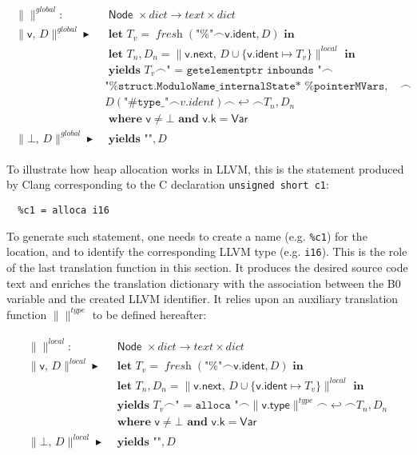 \documentclass{article}
\newcommand{\trad}[2]{\ensuremath{\lVert \textsf{#1} \rVert^{\textit{#2}}}}
\newcommand{\nl}[0]{\ensuremath{\hookleftarrow}}
\newcommand{\mty}[0]{\texttt{""}}
\DeclareMathOperator{\conc}{\smallfrown}
\DeclareMathOperator{\isdef}{\blacktriangleright}
\DeclareMathOperator{\fresh}{\textit{fresh}}
\begin{document}
\begin{framed}
\begin{align}
\begin{split}
  \trad{}{global} : & \textsf{ Node } \times dict \rightarrow text \times dict \\
  \trad{v, $D$}{global} \isdef & 
  \textbf{ let } T_v = \fresh(\texttt{"\%"}\conc\textsf{v.ident}, D) \textbf{ in}  \\
  & \textbf{ let } T_n, D_n = \trad{v.next, $D \cup \{ \textsf{v.ident} \mapsto T_v \}$}{local} \textbf{ in}  \\
  & \textbf{ yields } T_v \conc \texttt{" = getelementptr inbounds "} \conc\\
  & \texttt{"\%struct.ModuloName\_internalState* \%pointerMVars, i64 0, i32 "} \conc \\
  & D(\texttt{"\#type\_"}\conc v.ident) \conc \nl \conc T_n, D_n  \\
  & \textbf{ where } \textsf{v} \ne \bot \textbf{ and } \textsf{v.k} = \textsf{Var}  \\
  \trad{$\bot$, $D$}{global} \isdef & 
  \textbf{ yields } \mty, D 
\end{split}
\end{align}
\end{framed}



To illustrate how heap allocation works in LLVM, this is the statement
produced by Clang corresponding to the C declaration
\verb^unsigned short c1^:
\begin{verbatim}
  %c1 = alloca i16
\end{verbatim}
To generate such statement, one needs to create a name
(e.g. \texttt{\%c1}) for the location, and to identify the
corresponding LLVM type (e.g. \texttt{i16}). This is the role of the
last translation function in this section. It produces the desired
source code text and enriches the translation dictionary with the
association between the B0 variable and the created LLVM identifier. It
relies upon an auxiliary translation function $\trad{}{type}$ to be
defined hereafter:
\begin{framed}
\begin{align}
\begin{split}
  \trad{}{local} : & \textsf{ Node } \times dict \rightarrow text \times dict \\
  \trad{v, $D$}{local} \isdef & 
  \textbf{ let } T_v = \fresh(\texttt{"\%"}\conc\textsf{v.ident}, D) \textbf{ in}  \\
  & \textbf{ let } T_n, D_n = \trad{v.next, $D \cup \{ \textsf{v.ident} \mapsto T_v \}$}{local} \textbf{ in}  \\
  & \textbf{ yields } T_v \conc \texttt{" = alloca "} \conc \trad{v.type}{type} \conc \nl \conc T_n, D_n  \\
  & \textbf{ where } \textsf{v} \ne \bot \textbf{ and } \textsf{v.k} = \textsf{Var}  \\
  \trad{$\bot$, $D$}{local} \isdef & 
  \textbf{ yields } \mty, D 
\end{split}
\end{align}
\end{framed}
\end{document}
